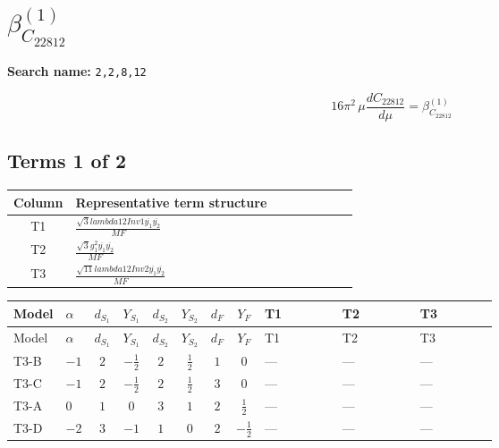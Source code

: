 \documentclass[8pt]{article}
\begin{document}
\begin{landscape}
\begin{longtable}{@{}llcccccc >{\raggedright\arraybackslash}p{0.21\linewidth} >{\raggedright\arraybackslash}p{0.21\linewidth} >{\raggedright\arraybackslash}p{0.21\linewidth}@{}}
\midrule
\bottomrule
\end{longtable}
\clearpage
\section*{$\beta_{C_{22812}}^{(1)}$}
\noindent\textbf{Search name: }\texttt{2,2,8,12}\par\smallskip
\[16\pi^2\,\mu\frac{d C_{22812}}{d\mu}=\beta_{C_{22812}}^{(1)}\]
\subsection*{Terms 1 of 2}
\begin{center}
\begin{tabular}{@{}c >{\raggedright\arraybackslash}p{0.82\linewidth}@{}}
\toprule
Column & Representative term structure \\
\midrule
T1 & \(\displaystyle \frac{\sqrt{3} lambda12Inv1 \overline{y_{1}} \overline{y_{2}}}{MF}\) \\
\midrule
T2 & \(\displaystyle \frac{\sqrt{3} g_{1}^{2} \overline{y_{1}} \overline{y_{2}}}{MF}\) \\
\midrule
T3 & \(\displaystyle \frac{\sqrt{11} lambda12Inv2 \overline{y_{1}} \overline{y_{2}}}{MF}\) \\
\midrule
\bottomrule
\end{tabular}
\end{center}
\smallskip
\tiny
\begin{longtable}{@{}llcccccc >{\raggedright\arraybackslash}p{0.21\linewidth} >{\raggedright\arraybackslash}p{0.21\linewidth} >{\raggedright\arraybackslash}p{0.21\linewidth}@{}}
\toprule
Model & $\alpha$ & $d_{S_1}$ & $Y_{S_1}$ & $d_{S_2}$ & $Y_{S_2}$ & $d_F$ & $Y_F$ & T1 & T2 & T3 \\
\midrule
\endfirsthead
\toprule
Model & $\alpha$ & $d_{S_1}$ & $Y_{S_1}$ & $d_{S_2}$ & $Y_{S_2}$ & $d_F$ & $Y_F$ & T1 & T2 & T3 \\
\midrule
\endhead
T3-B & $-1$ & $2$ & $-\frac{1}{2}$ & $2$ & $\frac{1}{2}$ & $1$ & $0$ & --- & --- & --- \\
\midrule
T3-C & $-1$ & $2$ & $-\frac{1}{2}$ & $2$ & $\frac{1}{2}$ & $3$ & $0$ & --- & --- & --- \\
\midrule
T3-A & $0$ & $1$ & $0$ & $3$ & $1$ & $2$ & $\frac{1}{2}$ & --- & --- & --- \\
\midrule
T3-D & $-2$ & $3$ & $-1$ & $1$ & $0$ & $2$ & $-\frac{1}{2}$ & --- & --- & --- \\
\midrule

\end{longtable}
\end{landscape}
\end{document}
